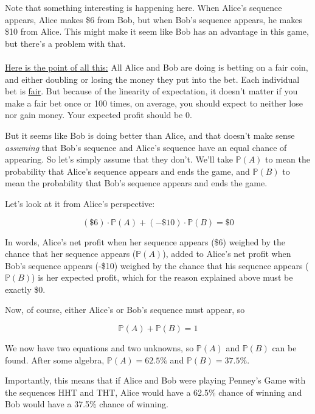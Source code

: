 \documentclass[english,12pt,a4paper,final]{article}
\begin{document}
Note that something interesting is happening here. When Alice's sequence appears, Alice makes \$6 from Bob, but when Bob's sequence appears, he makes \$10 from Alice. This might make it seem like Bob has an advantage in this game, but there's a problem with that.
\\\\
\underline{Here is the point of all this:} All Alice and Bob are doing is betting on a fair coin, and either doubling or losing the money they put into the bet. Each individual bet is \underline{fair}. But because of the linearity of expectation, it doesn't matter if you make a fair bet once or 100 times, on average, you should expect to neither lose nor gain money. Your expected profit should be 0.

But it seems like Bob is doing better than Alice, and that doesn't make sense \textit{assuming} that Bob's sequence and Alice's sequence have an equal chance of appearing. So let's simply assume that they don't. We'll take $\mathbb{P}(A)$ to mean the probability that Alice's sequence appears and ends the game, and $\mathbb{P}(B)$ to mean the probability that Bob's sequence appears and ends the game.

Let's look at it from Alice's perspective:

\begin{equation*}
	(\$6) \cdot \mathbb{P}(A)  + (-\$10) \cdot \mathbb{P}(B) = \$0
\end{equation*}

In words, Alice's net profit when her sequence appears (\$6) weighed by the chance that her sequence appears ($\mathbb{P}(A)$), added to Alice's net profit when Bob's sequence appears (-\$10) weighed by the chance that his sequence appears ($\mathbb{P}(B)$) is her expected profit, which for the reason explained above must be exactly \$0.

Now, of course, either Alice's or Bob's sequence must appear, so

\begin{equation}\label{PA+PB=1}
	\mathbb{P}(A) + \mathbb{P}(B) = 1
\end{equation}

We now have two equations and two unknowns, so $\mathbb{P}(A)$ and $\mathbb{P}(B)$ can be found. After some algebra, $\mathbb{P}(A) = 62.5\%$ and $\mathbb{P}(B) = 37.5\%$.

Importantly, this means that if Alice and Bob were playing Penney's Game with the sequences HHT and THT, Alice would have a 62.5\% chance of winning and Bob would have a 37.5\% chance of winning.
\end{document}
